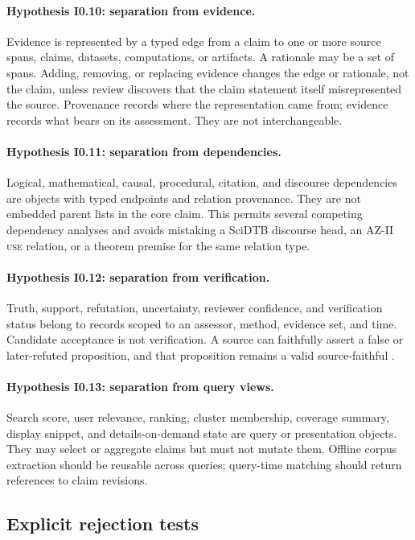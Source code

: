 \paragraph{Hypothesis I0.10: separation from evidence.}
Evidence is represented by a typed edge from a claim to one or more source spans, claims, datasets, computations, or artifacts. A rationale may be a set of spans. Adding, removing, or replacing evidence changes the edge or rationale, not the claim, unless review discovers that the claim statement itself misrepresented the source. Provenance records where the representation came from; evidence records what bears on its assessment. They are not interchangeable.

\paragraph{Hypothesis I0.11: separation from dependencies.}
Logical, mathematical, causal, procedural, citation, and discourse dependencies are \ClaimRelation{} objects with typed endpoints and relation provenance. They are not embedded parent lists in the core claim. This permits several competing dependency analyses and avoids mistaking a SciDTB discourse head, an AZ-II \textsc{use} relation, or a theorem premise for the same relation type.

\paragraph{Hypothesis I0.12: separation from verification.}
Truth, support, refutation, uncertainty, reviewer confidence, and verification status belong to \ClaimAssessment{} records scoped to an assessor, method, evidence set, and time. Candidate acceptance is not verification. A source can faithfully assert a false or later-refuted proposition, and that proposition remains a valid source-faithful \ScientificClaim{}.

\paragraph{Hypothesis I0.13: separation from query views.}
Search score, user relevance, ranking, cluster membership, coverage summary, display snippet, and details-on-demand state are query or presentation objects. They may select or aggregate claims but must not mutate them. Offline corpus extraction should be reusable across queries; query-time matching should return references to claim revisions.

\subsection{Explicit rejection tests}\label{sec:i0-rejection}

